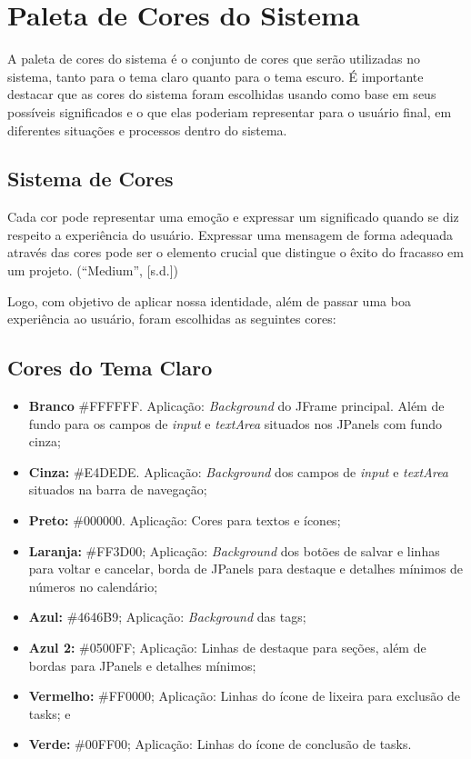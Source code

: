 \documentclass[a4paper,12pt]{article}
\begin{document}
\pagebreak
\section{Paleta de Cores do Sistema}
A paleta de cores do sistema é o conjunto de cores que serão utilizadas no sistema, tanto para o tema claro quanto 
para o tema escuro. É importante destacar que as cores do sistema foram escolhidas usando como base em seus possíveis 
significados e o que elas poderiam representar para o usuário final, em diferentes situações e processos dentro do sistema. 

\subsection{Sistema de Cores}
Cada cor pode representar uma emoção e expressar um significado quando se diz respeito a experiência do usuário. Expressar uma 
mensagem de forma adequada através das cores pode ser o elemento crucial que distingue o êxito do fracasso em um projeto. (“Medium”, [s.d.])

Logo, com objetivo de aplicar nossa identidade, além de passar uma boa experiência ao usuário, foram escolhidas as seguintes cores:

\subsection{Cores do Tema Claro}
\begin{itemize}
	\item \textbf{Branco} \#FFFFFF. Aplicação: \textit{Background} do JFrame principal. Além de fundo para os campos de \textit{input} e \textit{textArea} 
	situados nos JPanels com fundo cinza;
	\item \textbf{Cinza:} \#E4DEDE. Aplicação: \textit{Background} dos campos de \textit{input} e \textit{textArea} situados na barra de navegação;
	\item \textbf{Preto:} \#000000. Aplicação: Cores para textos e ícones;
	\item \textbf{Laranja:} \#FF3D00; Aplicação: \textit{Background} dos botões de salvar e linhas para voltar e cancelar, borda de JPanels 
	para destaque e detalhes mínimos de números no calendário;
	\item \textbf{Azul:} \#4646B9; Aplicação: \textit{Background} das tags;
	\item \textbf{Azul 2:} \#0500FF; Aplicação: Linhas de destaque para seções, além de bordas para JPanels e detalhes mínimos;
	\item \textbf{Vermelho:} \#FF0000; Aplicação: Linhas do ícone de lixeira para exclusão de tasks; e
	\item \textbf{Verde:} \#00FF00; Aplicação: Linhas do ícone de conclusão de tasks.
\end{itemize}
\end{document}
